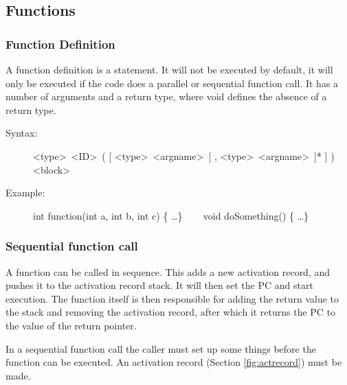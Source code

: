 \documentclass[10pt,a4paper]{report}
\begin{document}
\subsection{Functions} \label{subsec:functions}
\subsubsection{Function Definition}
A function definition is a statement. It will not be executed by default, it will only be executed if the code does a parallel or sequential function call. It has a number of arguments and a return type, where void defines the absence of a return type.

\begin{description}
	\item[Syntax:] 
		\textless type\textgreater ~\textless ID\textgreater ~( [ \textless type\textgreater ~\textless argname\textgreater ~[ , \textless type\textgreater ~\textless argname\textgreater ~]* ] ) \textless block\textgreater
	\item[Example:] 
		int function(int a, int b, int c) \{ \ldots \} ~~~
		void doSomething() \{ \ldots \}
\end{description} 



\subsubsection{Sequential function call}
A function can be called in sequence. This adds a new activation record, and pushes it to the activation record stack. It will then set the PC and start execution. The function itself is then responsible for adding the return value to the stack and removing the activation record, after which it returns the PC to the value of the return pointer.


In a sequential function call the caller must set up some things before the function can be executed. An activation record (Section \ref{fig:actrecord}) must be made. 
\end{document}

